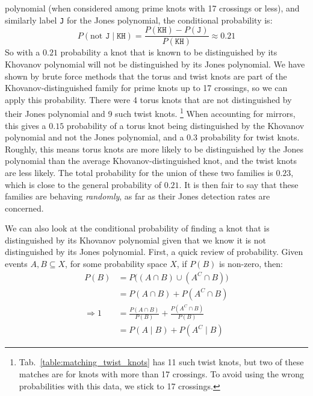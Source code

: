 \documentclass{article}
\theoremstyle{plain}
\begin{document}
        polynomial (when considered among prime knots with 17 crossings or less),
        and similarly label \texttt{J} for the Jones polynomial, the conditional
        probability is:
        \begin{equation}
            P(\textrm{not }\texttt{J}\;|\;\texttt{KH})
            =\frac{P(\texttt{KH})-P(\texttt{J})}{P(\texttt{KH})}
            \approx{0.21}
        \end{equation}
        So with a $0.21$ probability a knot that is known to be distinguished by
        its Khovanov polynomial will not be distinguished by its Jones polynomial.
        We have shown by brute force methods that the torus and twist knots are
        part of the Khovanov-distinguished family for prime knots up to 17
        crossings, so we can apply this probability. There were 4 torus knots that
        are not distinguished by their Jones polynomial and 9 such twist knots.%
        \footnote{%
            Tab.~\ref{table:matching_twist_knots} has 11 such twist knots, but
            two of these matches are for knots with more than 17 crossings. To
            avoid using the wrong probabilities with this data, we stick to
            17 crossings.
        }
        When accounting for mirrors, this gives a
        $0.15$ probability of a torus knot being distinguished by the Khovanov
        polynomial and not the Jones polynomial, and a $0.3$ probability for twist
        knots. Roughly, this means torus knots are more likely to be distinguished
        by the Jones polynomial than the average Khovanov-distinguished knot,
        and the twist knots are less likely. The total probability for the union
        of these two families is $0.23$, which is close to the general
        probability of $0.21$. It is then fair to say that these
        families are behaving \textit{randomly}, as far as their
        Jones detection rates are concerned.
        \par\hfill\par
        We can also look at the conditional probability of finding a knot that is
        distinguished by its Khovanov polynomial given that we know it is not
        distinguished by its Jones polynomial. First, a quick review of probability.
        Given events $A,B\subseteq{X}$, for some probability space $X$, if $P(B)$
        is non-zero, then:
        \begin{align}
            P(B)&=P\big((A\cap{B})\cup(A^{C}\cap{B})\big)\\
            &=P(A\cap{B})+P(A^{C}\cap{B})\\
            \Rightarrow
            1&=\frac{P(A\cap{B})}{P(B)}+\frac{P(A^{C}\cap{B})}{P(B)}\\
            &=P(A\;|\;B)+P(A^{C}\;|\;B)
        \end{align}
\end{document}
